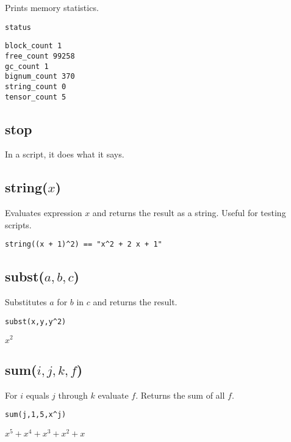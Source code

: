 Prints memory statistics.

\bigskip
\noindent
{\color{blue}
\verb$status$
}

\bigskip
\noindent
\verb$block_count 1$\\
\verb$free_count 99258$\\
\verb$gc_count 1$\\
\verb$bignum_count 370$\\
\verb$string_count 0$\\
\verb$tensor_count 5$

\subsection*{stop}

In a script, it does what it says.

\subsection*{string($x$)}

Evaluates expression $x$ and returns the result as a string.
Useful for testing scripts.

{\color{blue}
\begin{verbatim}
string((x + 1)^2) == "x^2 + 2 x + 1"
\end{verbatim}
}


\subsection*{subst($a,b,c$)}

Substitutes $a$ for $b$ in $c$ and returns the result.

{\color{blue}
\begin{verbatim}
subst(x,y,y^2)
\end{verbatim}
}

\noindent
$\displaystyle x^2$

\subsection*{sum($i,j,k,f$)}

For $i$ equals $j$ through $k$ evaluate $f$.
Returns the sum of all $f$.

{\color{blue}
\begin{verbatim}
sum(j,1,5,x^j)
\end{verbatim}
}

\noindent
$\displaystyle x^5+x^4+x^3+x^2+x$

